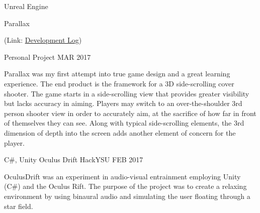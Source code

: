 
\begin{cventries}
	\cventry
	{{\color{awesome} Unreal Engine}} %
	{Parallax \begin{footnotesize}{(Link: \href{https://www.youtube.com/playlist?list=PLJCbmN5AjE1XUlgY5KwFnwDh3gmhvtiSC}{\color{awesome}\underline{Development Log}})}\end{footnotesize}} %
	{Personal Project} %
	{MAR 2017} %
	{
		\begin{cvitems} %
			\item {Parallax was my first attempt into true game design and a great learning experience. The end product is the framework for a 3D side-scrolling cover shooter. The game starts in a side-scrolling view that provides greater visibility but lacks accuracy in aiming. Players may switch to an over-the-shoulder 3rd person shooter view in order to accurately aim, at the sacrifice of how far in front of themselves they can see. Along with typical side-scrolling elements, the 3rd dimension of depth into the screen adds another element of concern for the player.}
		\end{cvitems}
	}
	\cventry
	{{\color{awesome} C\#, Unity}} %
	{Oculus Drift} %
	{HackYSU} %
	{FEB 2017} %
	{
		\begin{cvitems} %
			\item {OculusDrift was an experiment in audio-visual entrainment employing Unity (C\#) and the Oculus 
				Rift. The purpose of the project was to create a relaxing environment by using binaural audio and
				simulating the user floating through a star field.}
		\end{cvitems}
	}
			
\end{cventries}